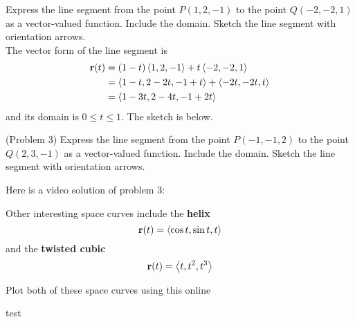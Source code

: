 \documentclass[handout]{ximera}
\begin{document}
\begin{example}[Example 3]
Express the line segment from the point $P(1, 2, -1)$ to the point $Q(-2, -2, 1)$ as a vector-valued function.  
Include the domain. Sketch the line segment with orientation arrows.\\
The vector form of the line segment is
\begin{align*}
    \mathbf r(t) &= (1-t)\left\langle 1, 2, -1\right\rangle + t \left\langle -2, -2, 1\right\rangle\\
              &= \left\langle 1-t, 2-2t, -1+t\right\rangle + \left\langle -2t, -2t, t\right\rangle\\
              &= \left\langle 1-3t, 2-4t, -1+2t\right\rangle
\end{align*}
and its domain is $0 \leq t \leq 1$. The sketch is below.




\begin{image}
\end{image}


\end{example}



\begin{problem}(Problem 3)
Express the line segment from the point $P(-1, -1, 2)$ to the point $Q(2, 3, -1)$ as a vector-valued function.  
Include the domain. Sketch the line segment with orientation arrows.
\end{problem}

Here is a video solution of problem 3:\\
\begin{foldable}
\end{foldable}

Other interesting space curves include the \textbf{helix}
\[
\mathbf r(t) = \left\langle \cos t, \sin t, t\right\rangle
\]
and the \textbf{twisted cubic}
\[
\mathbf r(t) = \left\langle t, t^2, t^3\right\rangle
\]

Plot both of these space curves using this online 

test
\end{document}
